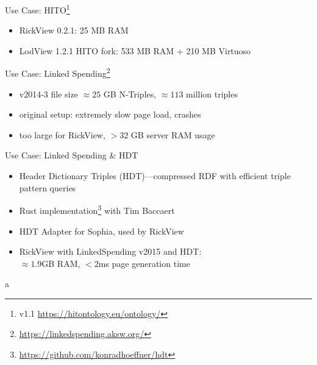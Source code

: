 \documentclass[14pt,aspectratio=1610]{beamer}
\begin{document}
\begin{frame}{Use Case: HITO\footnote{v1.1 \url{https://hitontology.eu/ontology/}}}
\begin{itemize}
\item RickView 0.2.1: 25 MB RAM
\item LodView 1.2.1 HITO fork: 533 MB RAM + 210 MB Virtuoso
\end{itemize}
\end{frame}

\begin{frame}{Use Case: Linked Spending\footnote{\url{https://linkedspending.aksw.org/}}}
\begin{itemize}
\item v2014-3 file size $\approx 25$ GB N-Triples, $\approx 113$ million triples
\item original setup: extremely slow page load, crashes
\item too large for RickView, $> 32$ GB server RAM usage
\end{itemize}
\end{frame}

\begin{frame}{Use Case: Linked Spending \& HDT}
\begin{itemize}
\item Header Dictionary Triples (HDT)---compressed RDF with efficient triple pattern queries
\item Rust implementation\footnote{\url{https://github.com/konradhoeffner/hdt}} with Tim Baccaert
\item HDT Adapter for Sophia, used by RickView
\item RickView with LinkedSpending v2015 and HDT:\\$\approx 1.9$GB RAM,  $<2$ms page generation time
\end{itemize}
\end{frame}

\begin{frame}{}
\end{frame}

\begin{frame}{}
\end{frame}
a
\end{document}
